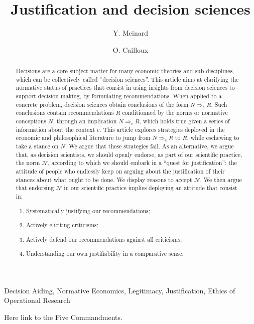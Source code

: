 \documentclass[preprint, french, english, 11pt, authoryear]{elsarticle}%
\newcommand{\adv}{\mathscr{N}}
\begin{document}
\title{Justification and decision sciences}

\author[ld]{Y. Meinard}
\author[ld]{O. Cailloux}
\address[ld]{Universit\'e Paris-Dauphine, PSL Research University, CNRS, UMR [7243], LAMSADE, 75016 PARIS, FRANCE}

\begin{abstract}
Decisions are a core subject matter for many economic theories and sub-disciplines, which can be collectively called ``decision sciences''. This article aims at clarifying the normative status of practices that consist in using insights from decision sciences to support decision-making, by formulating recommendations. When applied to a concrete problem, decision sciences obtain conclusions of the form $N ⇒_c R$. Such conclusions contain recommendations $R$ conditionned by the norms or normative conceptions $N$, through  an implication $N ⇒_c R$, which holds true given a series of information about the context $c$. This article explores strategies deployed in the economic and philosophical literature to jump from $N ⇒_c R$ to $R$, while eschewing to take a stance on $N$. We argue that these strategies fail. As an alternative, we argue that, as decision scientists, we should openly endorse, as part of our scientific practice, the norm $\adv$, according to which we should embark in a ``quest for justification'': the attitude of people who endlessly keep on arguing about the justification of their stances about what ought to be done. We display reasons to accept $\adv$. We then argue that endorsing $\adv$ in our scientific practice implies deploying an attitude that consist in:
\begin{enumerate}[label=\roman*.]
	\item Systematically justifying our recommendations;
	\item Actively eliciting criticisms;
	\item Actively defend our recommendations against all criticisms;
	\item Understanding our own justifiability in a comparative sense.
\end{enumerate}
\end{abstract}

\begin{keyword}
Decision Aiding, Normative Economics, Legitimacy, Justification, Ethics of Operational Research
\end{keyword}

\maketitle
Here link to the Five Commandments.
\end{document}
